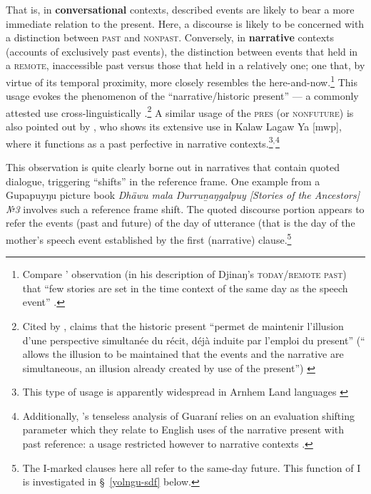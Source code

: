  That is, in \textbf{conversational} contexts, described events are likely to bear a more immediate relation to the present. Here, a discourse is likely to be concerned with a distinction between {\color{blue}\textsc{past}} and {\color{forest}\textsc{nonpast}}. Conversely, in \textbf{narrative} contexts (accounts of exclusively past events), the distinction between events that held in a {\color{blue}\textsc{remote}}, inaccessible past versus those that held in a relatively \textsc{\color{forest}{recent}} one; one that, by virtue of its temporal proximity, more closely resembles the here-and-now.\footnote{Compare \citeauthor{Waters1989}' observation (in his description of Djinaŋ's \textsc{today/remote past}) that ``few stories are set in the time context of the same day as the speech event'' \citeyearpar[188]{Waters1989}.} This usage evokes the phenomenon of the ``narrative/historic present'' --- a commonly attested use cross-linguistically  \citetext{see \citealp{Carruthers2012} for an overview}.\footnote{Cited by \citet[312]{Carruthers2012}, \citeauthor{Facques2007} claims that the historic present ``permet de maintenir l’illusion d’une perspective simultanée du récit, déjà induite par l’emploi du present” (``
 	allows the	illusion to be maintained that the events and the narrative are simultaneous, an illusion already created by use of the present”) \citetext{\citeyear[250--1]{Facques2007}, Carruthers' translation.}} A similar usage of the \textsc{pres} (or \textsc{nonfuture}) is also pointed out by \citet{Stirling2012a}, who shows its extensive use in Kalaw Lagaw Ya [\gls{mwp}], where it functions as a past perfective in narrative contexts.\footnote{This type of usage is apparently widespread in Arnhem Land languages \citetext{\citealp[\textit{e.g.},][]{Bednall2019} for Anindilyakwa [\gls{aoi}]}}$ ^, $\footnote{
	Additionally, \citeauthor{Pancheva2019}'s tenseless analysis of Guaraní relies on an evaluation shifting parameter which they relate to English uses of the narrative present with past reference: a usage restricted however to narrative contexts \citeyearpar{Pancheva2019}.
}

This observation is quite clearly borne out in narratives that contain quoted dialogue, triggering ``shifts'' in the reference frame. One example from a Gupapuyŋu picture book \textit{Dhäwu mala Ŋurruṉaŋgalpuy \textup{[Stories of the Ancestors]} №3} involves such a reference frame shift. The quoted discourse portion appears to refer the events (past and future) of the day of utterance (that is the day of the mother's speech event established by the first (narrative) clause.\footnote{The \gls{I}-marked clauses here all refer to the same-day future. This function of \gls{I} is investigated in \S~\ref{yolngu-sdf} below.}


